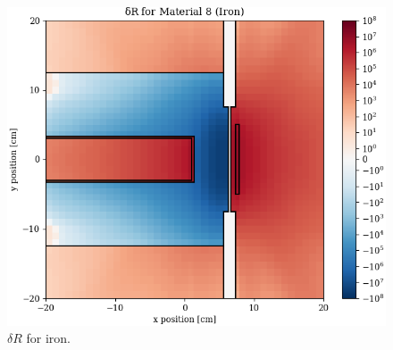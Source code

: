 \begin{figure}
\begin{minipage}{0.49\linewidth}
    \includegraphics[width=\linewidth]{content/testprob/dR_08.png}
    \caption{$\delta R$ for iron.}
    \label{fig:tp:dR_08}
  \end{minipage}
\end{figure}
